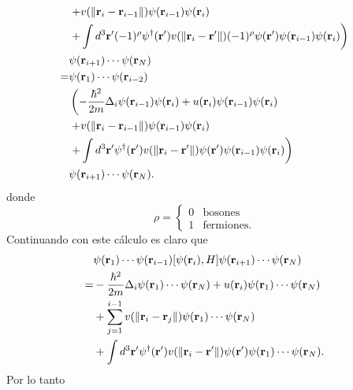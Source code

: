 \documentclass{article}
\begin{document}
\begin{align}
\begin{split}
&\left.+v(\|\vb{r}_i-\vb{r}_{i-1}\|)\psi(\vb{r}_{i-1})\psi(\vb{r}_i)\right.\\
&\left.+ \int d^3\vb{r}'(-1)^\rho\psi^\dagger(\vb{r}')v(\|\vb{r}_i-\vb{r}'\|)(-1)^\rho\psi(\vb{r}') \psi(\vb{r}_{i-1})\psi(\vb{r}_i)\right)\\
&\psi(\vb{r}_{i+1})\cdots\psi(\vb{r}_N)\\
=&\psi(\vb{r}_1)\cdots\psi(\vb{r}_{i-2})\\
&\left(- \frac{\hbar^2}{2m}\Delta_i\psi(\vb{r}_{i-1})\psi(\vb{r}_i)+ u(\vb{r}_i)\psi(\vb{r}_{i-1})\psi(\vb{r}_i)\right.\\
&\left.+v(\|\vb{r}_i-\vb{r}_{i-1}\|)\psi(\vb{r}_{i-1})\psi(\vb{r}_i)\right.\\
&\left.+ \int d^3\vb{r}'\psi^\dagger(\vb{r}')v(\|\vb{r}_i-\vb{r}'\|)\psi(\vb{r}') \psi(\vb{r}_{i-1})\psi(\vb{r}_i)\right)\\
&\psi(\vb{r}_{i+1})\cdots\psi(\vb{r}_N).
\end{split}
\end{align}
donde
\begin{equation}
\rho=\begin{cases}
0 & \text{bosones}\\
1 & \text{fermiones}.
\end{cases}
\end{equation}
Continuando con este cálculo es claro que 
\begin{align}
\begin{split}
&\psi(\vb{r}_1)\cdots\psi(\vb{r}_{i-1})[\psi(\vb{r}_i),H]\psi(\vb{r}_{i+1})\cdots\psi(\vb{r}_N)\\
=&- \frac{\hbar^2}{2m}\Delta_i\psi(\vb{r}_1)\cdots\psi(\vb{r}_N)+ u(\vb{r}_i)\psi(\vb{r}_1)\cdots\psi(\vb{r}_N)\\
&+\sum_{j=1}^{i-1} v(\|\vb{r}_i-\vb{r}_{j}\|)\psi(\vb{r}_1)\cdots\psi(\vb{r}_N)\\
&+ \int d^3\vb{r}'\psi^\dagger(\vb{r}')v(\|\vb{r}_i-\vb{r}'\|)\psi(\vb{r}') \psi(\vb{r}_1)\cdots\psi(\vb{r}_N).
\end{split}
\end{align}
Por lo tanto
\end{document}
